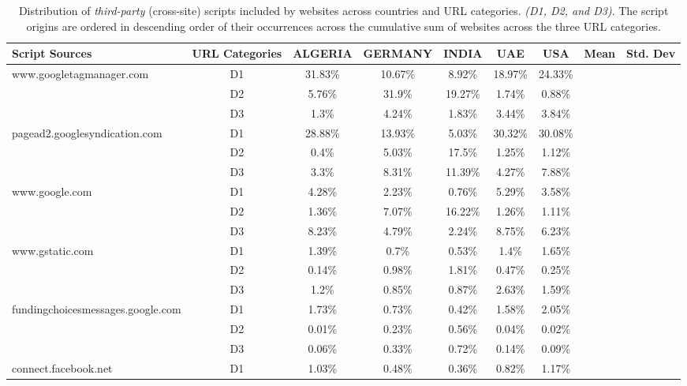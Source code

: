 \begin{table}[!ht]
    \centering
    \footnotesize
    \caption{Distribution of \textit{third-party} (cross-site) scripts included by websites across countries and URL categories. \textit{(D1, D2, and D3)}. The script origins are ordered in descending order of their occurrences across the cumulative sum of websites across the three URL categories.}
    \label{tab:3p_scripts_distrib}
    \begin{tabular}{l|c|c|c|c|c|c|c|c}
    \toprule
        \textbf{Script Sources} & \textbf{URL Categories} & \textbf{ALGERIA} & \textbf{GERMANY} & \textbf{INDIA} & \textbf{UAE} & \textbf{USA} & \textbf{Mean} & \textbf{Std. Dev} \\ \midrule
        \multirow{3}{*}{www.googletagmanager.com} & D1 & 31.83\% & 10.67\% & 8.92\% & 18.97\% & 24.33\% \\
        ~ & D2 & 5.76\% & 31.9\% & 19.27\% & 1.74\% & 0.88\% \\
        ~ & D3 & 1.3\% & 4.24\% & 1.83\% & 3.44\% & 3.84\% \\ \hline
        \multirow{3}{*}{pagead2.googlesyndication.com} & D1 & 28.88\% & 13.93\% & 5.03\% & 30.32\% & 30.08\% \\
        ~ & D2 & 0.4\% & 5.03\% & 17.5\% & 1.25\% & 1.12\% \\
        ~ & D3 & 3.3\% & 8.31\% & 11.39\% & 4.27\% & 7.88\% \\ \hline
        \multirow{3}{*}{www.google.com} & D1 & 4.28\% & 2.23\% & 0.76\% & 5.29\% & 3.58\% \\
        ~ & D2 & 1.36\% & 7.07\% & 16.22\% & 1.26\% & 1.11\% \\
        ~ & D3 & 8.23\% & 4.79\% & 2.24\% & 8.75\% & 6.23\% \\ \hline
        \multirow{3}{*}{www.gstatic.com} & D1 & 1.39\% & 0.7\% & 0.53\% & 1.4\% & 1.65\% \\
        ~ & D2 & 0.14\% & 0.98\% & 1.81\% & 0.47\% & 0.25\% \\
        ~ & D3 & 1.2\% & 0.85\% & 0.87\% & 2.63\% & 1.59\% \\ \hline
        \multirow{3}{*}{fundingchoicesmessages.google.com} & D1 & 1.73\% & 0.73\% & 0.42\% & 1.58\% & 2.05\% \\
        ~ & D2 & 0.01\% & 0.23\% & 0.56\% & 0.04\% & 0.02\% \\
        ~ & D3 & 0.06\% & 0.33\% & 0.72\% & 0.14\% & 0.09\% \\ \hline
        \multirow{3}{*}{connect.facebook.net} & D1 & 1.03\% & 0.48\% & 0.36\% & 0.82\% & 1.17\% \\

\end{tabular}
\end{table}
